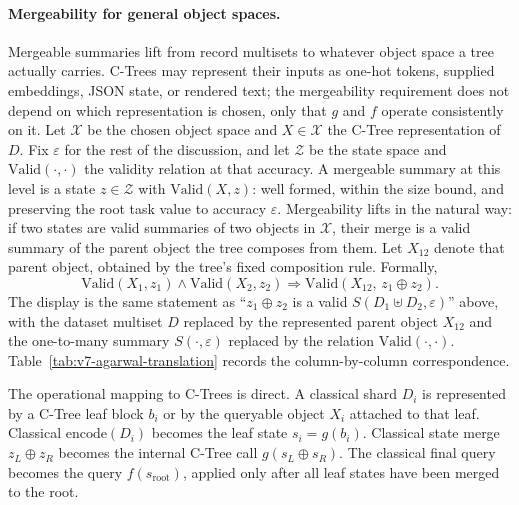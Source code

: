 \paragraph{Mergeability for general object spaces.}
Mergeable summaries lift from record multisets to whatever object
space a tree actually carries. C-Trees may represent their inputs as
one-hot tokens, supplied embeddings, JSON state, or rendered text;
the mergeability requirement does not depend on which representation
is chosen, only that \(g\) and \(f\) operate consistently on it. Let
\(\mathcal{X}\) be the chosen object space and \(X\in\mathcal{X}\)
the C-Tree representation of \(D\). Fix \(\varepsilon\) for the rest
of the discussion, and let \(\mathcal{Z}\) be the state space and
\(\mathrm{Valid}(\cdot,\cdot)\) the validity relation at that
accuracy. A mergeable summary at this level is a state
\(z\in\mathcal{Z}\) with \(\mathrm{Valid}(X,z)\): well formed, within
the size bound, and preserving the root task value to accuracy
\(\varepsilon\). Mergeability lifts in the natural way: if two states
are valid summaries of two objects in \(\mathcal{X}\), their merge is
a valid summary of the parent object the tree composes from them. Let
\(X_{12}\) denote that parent object, obtained by the tree's fixed
composition rule. Formally,
\[
  \mathrm{Valid}(X_1,z_1)
  \wedge
  \mathrm{Valid}(X_2,z_2)
  \Longrightarrow
  \mathrm{Valid}(X_{12},\,z_1\oplus z_2).
\]
The display is the same statement as ``\(z_1\oplus z_2\) is a valid
\(S(D_1\uplus D_2,\varepsilon)\)'' above, with the dataset multiset
\(D\) replaced by the represented parent object \(X_{12}\) and the
one-to-many summary \(S(\cdot,\varepsilon)\) replaced by the relation
\(\mathrm{Valid}(\cdot,\cdot)\). Table~\ref{tab:v7-agarwal-translation}
records the column-by-column correspondence.

The operational mapping to C-Trees is direct. A classical shard
\(D_i\) is represented by a C-Tree leaf block \(b_i\) or by the
queryable object \(X_i\) attached to that leaf. Classical
\(\mathrm{encode}(D_i)\) becomes the leaf state \(s_i=g(b_i)\).
Classical state merge \(z_L\oplus z_R\) becomes the internal C-Tree
call \(g(s_L\oplus s_R)\). The classical final query becomes the
query \(f(s_{\mathrm{root}})\), applied only after all leaf states
have been merged to the root.

